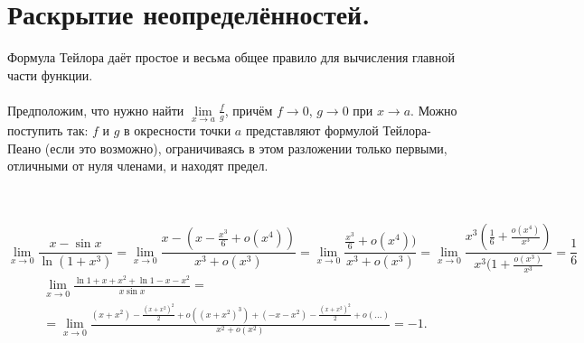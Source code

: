 	\section{Раскрытие неопределённостей.}
	Формула Тейлора даёт простое и весьма общее правило для вычисления главной части функции.\\\\
	Предположим, что нужно найти $ \lim\limits_{x \to a} \frac{f}{g}$, причём $f \rightarrow 0$, $g \rightarrow 0$ при $x \rightarrow a$.
	Можно поступить так:
	$f$ и $g$ в окресности точки $a$ представляют формулой Тейлора-Пеано (если это возможно), ограничиваясь в этом разложении только первыми, отличными от нуля членами, и находят предел.\\\\
	\begin{example}\\ 
		$$\lim\limits_{x \rightarrow 0}\frac{x - \sin x}{\ln{(1 + x^3)}} = \lim\limits_{x \rightarrow 0}\frac{x - (x - \frac{x^3}{6} + o(x^4))}{x^3 + o(x^3)} = \lim\limits_{x \rightarrow 0}\frac{\frac{x^3}{6} + o(x^4))}{x^3 + o(x^3)}
		= \lim\limits_{x \rightarrow 0}\frac{x^3(\frac{1}{6} + \frac{o(x^4)}{x^3} )}{x^3(1 + \frac{o(x^3)}{x^3}} = \frac{1}{6}$$
		\begin{multline*}
			\lim\limits_{x \rightarrow 0}\frac{\ln{1 + x + x^2} + \ln{1 - x  - x^2}}{x\sin x} =\\= \lim\limits_{x \rightarrow 0}\frac{(x + x^2) - \frac{{(x + x^2)}^2}{2} + o({(x + x^2)}^3) + (-x - x^2) - \frac{{(x + x^2)}^2}{2} + o(\ldots)}{x^2 + o(x^2)} = -1.
		\end{multline*}
	\end{example}